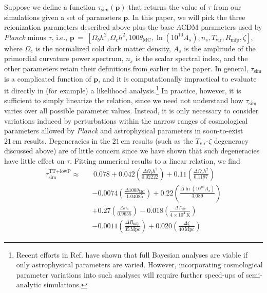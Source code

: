 \documentclass[twocolumn,aps,prd,nofootinbib,showpacs]{revtex4-1}
\begin{document}
Suppose we define a function $\tau_\textrm{sim} (\mathbf{p})$ that returns the value of $\tau$ from our simulations given a set of parameters $\mathbf{p}$. In this paper, we will pick the three reionization parameters described above plus the base $\Lambda$CDM parameters used by \emph{Planck} minus $\tau$, i.e., $\mathbf{p}~=~\left[ \Omega_b h^2, \Omega_c h^2, 100\theta_\textrm{MC}, \ln ( 10^{10} A_s), n_s, T_\textrm{vir}, R_\textrm{mfp}, \zeta \right]$, where $\Omega_c$ is the normalized cold dark matter density, $A_s$ is the amplitude of the primordial curvature power spectrum, $n_s$ is the scalar spectral index, and the other parameters retain their definitions from earlier in the paper. In general, $\tau_\textrm{sim}$ is a complicated function of $\mathbf{p}$, and it is computationally impractical to evaluate it directly in (for example) a likelihood analysis.\footnote{Recent efforts in Ref. \cite{greig_and_mesinger2015} have shown that full Bayesian analyses are viable if only astrophysical parameters are varied. However, incorporating cosmological parameter variations into such analyses will require further speed-ups of semi-analytic simulations.}  In practice, however, it is sufficient to simply linearize the relation, since we need not understand how $\tau_\textrm{sim}$ varies over all possible parameter values. Instead, it is only necessary to consider variations induced by perturbations within the narrow ranges of cosmological parameters allowed by \emph{Planck} and astrophysical parameters in soon-to-exist $21\,\textrm{cm}$ results. Degeneracies in the $21\,\textrm{cm}$ results (such as the $T_\textrm{vir}$-$\zeta$ degeneracy discussed above) are of little concern since we have shown that such degeneracies have little effect on $\tau$. Fitting numerical results to a linear relation, we find
\begin{eqnarray}
\label{eq:TTlowP_linearTau}
\tau_\textrm{sim}^\textrm{TT+lowP} \approx &&\, 0.078 + 0.042 \left(\frac{\Delta\Omega_b h^2}{0.02222}\right) +  0.11\left(\frac{\Delta\Omega_c h^2}{0.1197}\right) \nonumber\\
&& -0.0074 \left(\frac{\Delta100\theta_\textrm{MC}}{1.04085}\right)  + 0.22  \left(\frac{\Delta\ln (10^{10} A_s)}{3.089}\right)\nonumber \\
&& + 0.27 \left(\frac{\Delta n_s}{0.9655}\right) -0.018\left(\frac{\Delta T_\textrm{vir}}{4 \times 10^4\,\textrm{K}}\right)\nonumber \\
&& -0.0011 \left(\frac{\Delta R_\textrm{mfp}}{35\,\textrm{Mpc}}\right) + 0.020 \left(\frac{\Delta \zeta}{40\,\textrm{Mpc}}\right)
\end{eqnarray}
\end{document}
